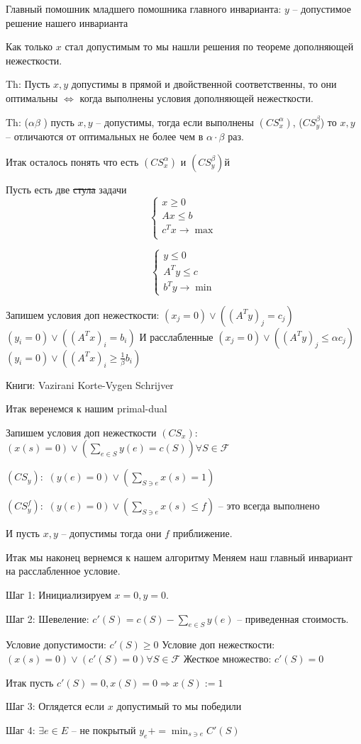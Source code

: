 Главный помошник младшего помошника главного инварианта: $y$ -- допустимое решение нашего инварианта

Как только $x$ стал допустимым то мы нашли решения по теореме дополняющей нежесткости.

Th: Пусть $x, y$ допустимы в прямой и двойственной соответственны, 
то они оптимальны $\Leftrightarrow$ когда выполнены условия дополняющей нежесткости.

Th: ($\alpha \beta$ ) пусть $x, y$ -- допустимы, тогда если выполнены
$(CS^\alpha_x)$, ($CS^\beta_y$) то $x, y$ -- отличаются от оптимальных не более чем в $\alpha \cdot \beta$ раз.

Итак осталось понять что есть $(CS^\alpha_x)$ и $(CS^\beta_y)$й

Пусть есть две \sout{стула} задачи
\[
	\begin{cases}
		x \geq 0\\
		A x \leq b\\
		c^Tx \to \max\\
	\end{cases}
\]

\[
	\begin{cases}
		y \leq 0\\
		A^Ty \leq c\\
		b^T y \to \min
	\end{cases}
\]

Запишем условия доп нежесткости:
$(x_j = 0) \vee \left(\left(A^T y\right)_j = c_j\right)$
$(y_i = 0) \vee \left(\left(A^T x\right)_i = b_i\right)$
И расслабленные
$(x_j = 0) \vee \left(\left(A^T y\right)_j \leq \alpha c_j\right)$
$(y_i = 0) \vee \left(\left(A^T x\right)_i \geq \frac1\beta b_i\right)$

Книги:
Vazirani
Korte-Vygen
Schrijver

Итак веренемся к нашим primal-dual

Запишем условия доп нежесткости
$(CS_x):$ $(x(s) = 0) \vee (\sum_{e \in S} y(e) = c(S)) \forall S \in \mathcal{F}$

$(CS_y):$ $(y(e) = 0) \vee (\sum_{S \ni e} x(s) = 1)$

$(CS_y^f):$ $(y(e) = 0) \vee (\sum_{S \ni e} x(s) \leq f)$ -- это всегда выполнено

И пусть $x, y$ -- допустимы тогда они $f$ приближение.

Итак мы наконец вернемся к нашем алгоритму
Меняем наш главный инвариант на расслабленное условие.

Шаг 1:
Инициализируем $x = 0, y = 0$.

Шаг 2:
Шевеление:
$c'(S) = c(S) - \sum_{e \in S} y(e)$ -- приведенная стоимость.

Условие допустимости: $c'(S) \geq 0$
Условие доп нежесткости: $(x(s) = 0) \vee (c'(S) = 0) \forall S \in \mathcal{F}$
Жесткое множество: $c'(S) = 0$

Итак пусть $c'(S) = 0, x(S) = 0 \Rightarrow x(S) := 1$

Шаг 3:
Оглядется если $x$ допустимый то мы победили

Шаг 4:
$\exists e \in E$ -- не покрытый
$y_e += \min_{s \ni e} C'(S)$